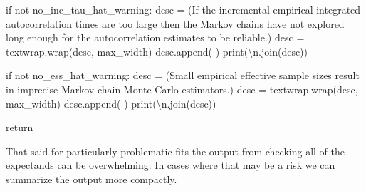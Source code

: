 \documentclass[
  letterpaper,
  DIV=11,
  numbers=noendperiod]{scrartcl}
\newenvironment{Shaded}{\begin{snugshade}}{\end{snugshade}}
\newcommand{\BuiltInTok}[1]{\textcolor[rgb]{0.00,0.23,0.31}{#1}}
\newcommand{\CharTok}[1]{\textcolor[rgb]{0.13,0.47,0.30}{#1}}
\newcommand{\ControlFlowTok}[1]{\textcolor[rgb]{0.00,0.23,0.31}{#1}}
\newcommand{\KeywordTok}[1]{\textcolor[rgb]{0.00,0.23,0.31}{#1}}
\newcommand{\NormalTok}[1]{\textcolor[rgb]{0.00,0.23,0.31}{#1}}
\newcommand{\OperatorTok}[1]{\textcolor[rgb]{0.37,0.37,0.37}{#1}}
\newcommand{\StringTok}[1]{\textcolor[rgb]{0.13,0.47,0.30}{#1}}
\begin{document}
\begin{Shaded}
\begin{Highlighting}[]
  \ControlFlowTok{if} \KeywordTok{not}\NormalTok{ no\_inc\_tau\_hat\_warning:}
\NormalTok{    desc }\OperatorTok{=}\NormalTok{ (}\StringTok{\textquotesingle{}If the incremental empirical integrated autocorrelation \textquotesingle{}}
            \StringTok{\textquotesingle{}times are too large then the Markov \textquotesingle{}}
            \StringTok{\textquotesingle{}chains have not explored long enough for the \textquotesingle{}}
            \StringTok{\textquotesingle{}autocorrelation estimates to be reliable.\textquotesingle{}}\NormalTok{)}
\NormalTok{    desc }\OperatorTok{=}\NormalTok{ textwrap.wrap(desc, max\_width)}
\NormalTok{    desc.append(}\StringTok{\textquotesingle{} \textquotesingle{}}\NormalTok{)}
    \BuiltInTok{print}\NormalTok{(}\StringTok{\textquotesingle{}}\CharTok{\textbackslash{}n}\StringTok{\textquotesingle{}}\NormalTok{.join(desc))}

  \ControlFlowTok{if} \KeywordTok{not}\NormalTok{ no\_ess\_hat\_warning:}
\NormalTok{    desc }\OperatorTok{=}\NormalTok{ (}\StringTok{\textquotesingle{}Small empirical effective sample sizes result in \textquotesingle{}}
            \StringTok{\textquotesingle{}imprecise Markov chain Monte Carlo estimators.\textquotesingle{}}\NormalTok{)}
\NormalTok{    desc }\OperatorTok{=}\NormalTok{ textwrap.wrap(desc, max\_width)}
\NormalTok{    desc.append(}\StringTok{\textquotesingle{} \textquotesingle{}}\NormalTok{)}
    \BuiltInTok{print}\NormalTok{(}\StringTok{\textquotesingle{}}\CharTok{\textbackslash{}n}\StringTok{\textquotesingle{}}\NormalTok{.join(desc))}

  \ControlFlowTok{return}
\end{Highlighting}
\end{Shaded}

That said for particularly problematic fits the output from checking all
of the expectands can be overwhelming. In cases where that may be a risk
we can summarize the output more compactly.
\end{document}

